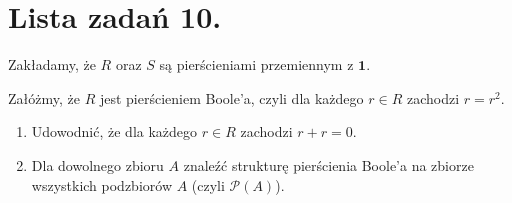 \chapter{Lista zadań 10.}

Zakładamy, że $R$ oraz $S$ są pierścieniami przemiennym z $\mathbf{1}$.

\begin{problem}[1]
	Załóżmy, że $R$ jest pierścieniem Boole'a, czyli dla każdego $r\in R$ zachodzi $r = r^2$.
	\begin{enumerate}[label=\alph*)]
		\item Udowodnić, że dla każdego $r\in R$ zachodzi $r+r = 0.$
		\item Dla dowolnego zbioru  $A$ znaleźć strukturę pierścienia Boole'a na zbiorze wszystkich podzbiorów  $A$ (czyli $\mathcal{P}(A) $).
	\end{enumerate}
\end{problem} 
